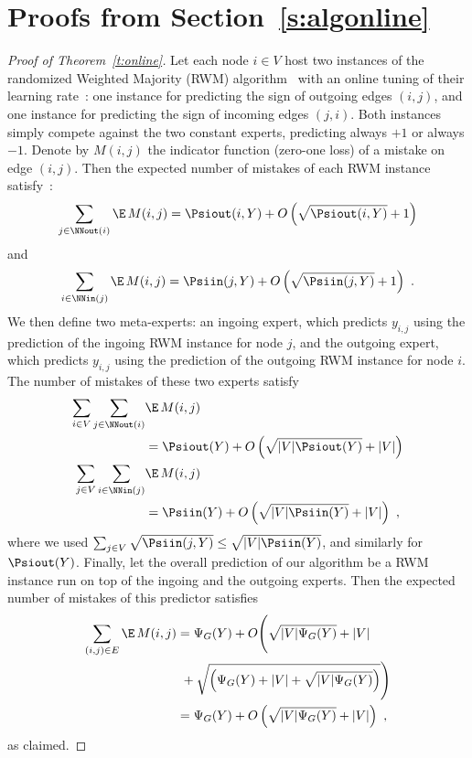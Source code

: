 \section{Proofs from Section~\ref{s:algonline}}
%


\begin{proof}[Proof of Theorem~\ref{t:online}]
Let each node $i \in V$ host two instances of the randomized Weighted Majority (RWM) algorithm~\cite{LittlestoneWa94} with an online tuning of their learning rate~\cite{cb+97,acg02}: one instance for predicting the sign of outgoing edges $(i,j)$, and one instance for predicting the sign of incoming edges $(j,i)$. Both instances simply compete against the two constant experts, predicting always $+1$ or always $-1$. Denote by $M(i,j)$ the indicator function (zero-one loss) of a mistake on edge $(i,j)$. Then the expected number of mistakes of each RWM instance satisfy~\cite{cb+97,acg02}:
\[
    \sum_{j \in \NNout(i)} \E\,M(i,j) = \Psiout(i,Y) + O\left(\sqrt{\Psiout(i,Y)}+ 1\right)
\]
and
\[
    \sum_{i \in \NNin(j)} \E\,M(i,j) = \Psiin(j,Y) + O\left(\sqrt{\Psiin(j,Y)} + 1\right)~.
\]
We then define two meta-experts: an ingoing expert, which predicts $y_{i,j}$ using the prediction of the ingoing RWM instance for node $j$, and the outgoing expert, which predicts $y_{i,j}$ using the prediction of the outgoing RWM instance for node $i$.
The number of mistakes of these two experts satisfy
\begin{align*}
\sum_{i \in V}\sum_{j \in \NNout(i)} &\E\,M(i,j)\\ 
&= \Psiout(Y) + O\left(\sqrt{|V|\Psiout(Y)} + |V|\right)\\
\sum_{j \in V}\sum_{i \in \NNin(j)} &\E\,M(i,j)\\ 
&= \Psiin(Y)  + O\left(\sqrt{|V|\Psiin(Y)}  + |V|\right)~,
\end{align*}
where we used $\sum_{j \in V} \sqrt{\Psiin(j,Y)} \leq \sqrt{|V|\Psiin(Y)}$, and similarly for $\Psiout(Y)$.
Finally, let the overall prediction of our algorithm be a RWM instance run on top of the ingoing and the outgoing experts. Then the expected number of mistakes of this predictor satisfies
%
\begin{align*}
    \sum_{(i,j) \in E} \E\,M(i,j) 
&= \Psi_G(Y) + O\Biggl(\sqrt{|V|\Psi_G(Y)} + |V|\\ 
&\,\,+ \sqrt{\left(\Psi_G(Y) + |V| + \sqrt{|V|\Psi_G(Y)}\right)} \Biggl)\\
&= \Psi_G(Y) + O\left(\sqrt{|V|\Psi_G(Y)} + |V|\right)~,
\end{align*}
%
as claimed.
\end{proof}

